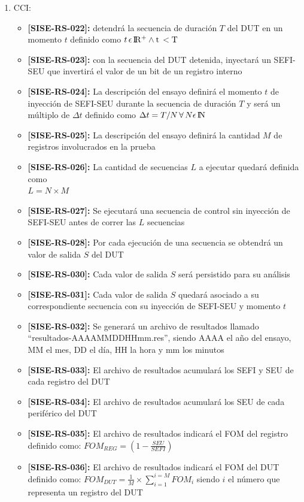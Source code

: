 \documentclass[
11pt, %
codirector, %
]{charter}
\def\codigo{SISE-RS}
\newcommand{\req}[1]{\textbf{[\codigo-#1]:}}
\begin{document}
\begin{enumerate}
	\item CCI:
		\begin{itemize}
			\item \req{022} detendrá la secuencia de duración $ T $ del DUT en un momento $ t $ definido como $ t \, \epsilon \, \rm I\!R^+ \wedge t \, < T$
			\item \req{023} con la secuencia del DUT detenida, inyectará un SEFI-SEU que invertirá el valor de un bit de un registro interno
			\item \req{024} La descripción del ensayo definirá el momento $ t $ de inyección de SEFI-SEU durante la secuencia de duración $ T $ y será un múltiplo de $\Delta t$ definido como $ \Delta t=T/N \, \forall \, N \epsilon \, \rm I\!N $
			\item \req{025} La descripción del ensayo definirá la cantidad $ M $ de registros involucrados en la prueba
			\item \req{026} La cantidad de secuencias $ L $ a ejecutar quedará definida como \\$ L = N \times M $
			\item \req{027} Se ejecutará una secuencia de control sin inyección de SEFI-SEU antes de correr las $ L $ secuencias
			\item \req{028} Por cada ejecución de una secuencia se obtendrá un valor de salida $ S $ del DUT
			\item \req{030} Cada valor de salida $ S $ será persistido para su análisis
			\item \req{031} Cada valor de salida $ S $ quedará asociado a su correspondiente secuencia con su inyección de SEFI-SEU y momento $ t $
			\item \req{032} Se generará un archivo de resultados llamado\\ ``resultados-AAAAMMDDHHmm.res'', siendo AAAA el año del ensayo, MM el mes, DD el día, HH la hora y mm los minutos
			\item \req{033} El archivo de resultados acumulará los SEFI y SEU de cada registro del DUT
			\item \req{034} El archivo de resultados acumulará los SEU de cada periférico del DUT
			\item \req{035} El archivo de resultados indicará el FOM del registro definido como:
			$ FOM_{REG} = (1 - \frac{SEU}{SEFI}) $
			\item \req{036} El archivo de resultados indicará el FOM del DUT definido como:
			$ FOM_{DUT} = \frac{1}{M} \times \sum_{i = 1}^{i = M}FOM_{i} $ siendo $ i $ el número que representa un registro del DUT

\end{itemize}
\end{enumerate}
\end{document}
